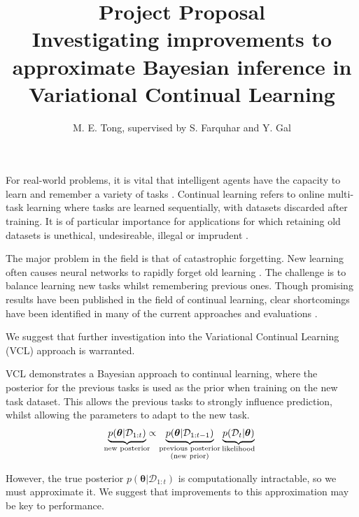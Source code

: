 \documentclass[a4paper,11pt]{article}
\title{\vspace*{-1.75em}\textbf{Project Proposal}\\ \vspace{0.25em} \Large Investigating improvements to approximate Bayesian inference in Variational Continual Learning}
\author{M. E. Tong, supervised by S. Farquhar and Y. Gal}
\date{}
\let\boldtheta\theta %
\renewcommand{\theta}{\boldsymbol{\boldtheta}} %
\begin{document}
\maketitle


For real-world problems, it is vital that intelligent agents have the capacity to learn and remember a variety of tasks \cite{overcoming}. Continual learning refers to online multi-task learning where tasks are learned sequentially, with datasets discarded after training. It is of particular importance for applications for which retaining old datasets is unethical, undesireable, illegal or imprudent \cite{unifying, robust}.

The major problem in the field is that of catastrophic forgetting. New learning often causes neural networks to rapidly forget old learning \cite{catastrophic}. The challenge is to balance learning new tasks whilst remembering previous ones. Though promising results have been published in the field of continual learning, clear shortcomings have been identified in many of the current approaches and evaluations \cite{robust}. %

We suggest that further investigation into the Variational Continual Learning (VCL) approach \cite{vcl} is warranted.

VCL demonstrates a Bayesian approach to continual learning, where the posterior for the previous tasks is used as the prior when training on the new task dataset. This allows the previous tasks to strongly influence prediction, whilst allowing the parameters to adapt to the new task. 
\begin{equation}\label{eq:1}
\begin{split}
\underbrace{p(\theta | \mathcal{D}_{1:t})}_{\mathclap{\text{new posterior}}} \propto \underbrace{p(\theta | \mathcal{D}_{1:t-1})}_{\substack{\text{previous posterior}\\ (\text{new prior})}} \underbrace{p(\mathcal{D}_t | \theta)}_{\text{likelihood}}
\end{split}
\end{equation}

However, the true posterior $p(\theta | \mathcal{D}_{1:t})$ is computationally intractable, so we must approximate it. We suggest that improvements to this approximation may be key to performance. 
\end{document}
